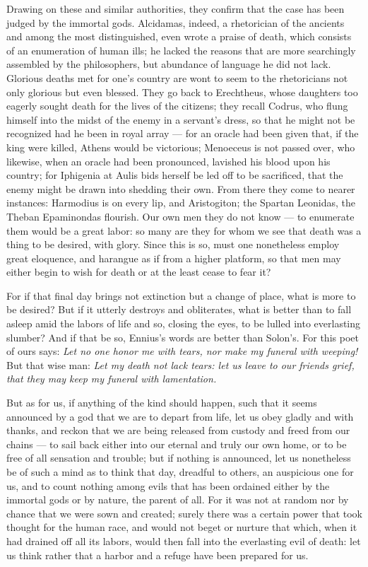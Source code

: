  Drawing on these and similar authorities, they confirm that the case has been judged by the immortal gods. Alcidamas, indeed, a rhetorician of the ancients and among the most distinguished, even wrote a praise of death, which consists of an enumeration of human ills; he lacked the reasons that are more searchingly assembled by the philosophers, but abundance of language he did not lack. Glorious deaths met for one's country are wont to seem to the rhetoricians not only glorious but even blessed. They go back to Erechtheus, whose daughters too eagerly sought death for the lives of the citizens; they recall Codrus, who flung himself into the midst of the enemy in a servant's dress, so that he might not be recognized had he been in royal array — for an oracle had been given that, if the king were killed, Athens would be victorious; Menoeceus is not passed over, who likewise, when an oracle had been pronounced, lavished his blood upon his country; for Iphigenia at Aulis bids herself be led off to be sacrificed, that the enemy might be drawn into shedding their own. From there they come to nearer instances: Harmodius is on every lip, and Aristogiton; the Spartan Leonidas, the Theban Epaminondas flourish. Our own men they do not know — to enumerate them would be a great labor: so many are they for whom we see that death was a thing to be desired, with glory. Since this is so, must one nonetheless employ great eloquence, and harangue as if from a higher platform, so that men may either begin to wish for death or at the least cease to fear it?

 For if that final day brings not extinction but a change of place, what is more to be desired? But if it utterly destroys and obliterates, what is better than to fall asleep amid the labors of life and so, closing the eyes, to be lulled into everlasting slumber? And if that be so, Ennius's words are better than Solon's. For this poet of ours says: \textit{Let no one honor me with tears, nor make my funeral with weeping!} But that wise man: \textit{Let my death not lack tears: let us leave to our friends grief, that they may keep my funeral with lamentation.}

 But as for us, if anything of the kind should happen, such that it seems announced by a god that we are to depart from life, let us obey gladly and with thanks, and reckon that we are being released from custody and freed from our chains — to sail back either into our eternal and truly our own home, or to be free of all sensation and trouble; but if nothing is announced, let us nonetheless be of such a mind as to think that day, dreadful to others, an auspicious one for us, and to count nothing among evils that has been ordained either by the immortal gods or by nature, the parent of all. For it was not at random nor by chance that we were sown and created; surely there was a certain power that took thought for the human race, and would not beget or nurture that which, when it had drained off all its labors, would then fall into the everlasting evil of death: let us think rather that a harbor and a refuge have been prepared for us.

